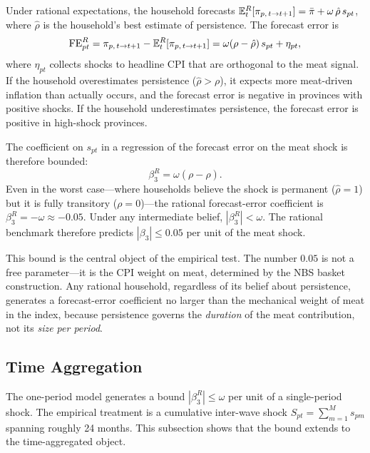Under rational expectations, the household forecasts
$\mathbb{E}_t^{R}[\pi_{p,\,t \to t+1}] = \bar{\pi}
  + \omega\,\hat{\rho}\,s_{pt}$,
where $\hat{\rho}$ is the household's best estimate of
persistence.
The forecast error is
\begin{equation}\label{eq:rational_fe}
  \mathrm{FE}^{R}_{pt}
  = \pi_{p,\,t \to t+1} - \mathbb{E}_t^{R}[\pi_{p,\,t \to t+1}]
  = \omega(\rho - \hat{\rho})\,s_{pt} + \eta_{pt},
\end{equation}
where $\eta_{pt}$ collects shocks to headline CPI that are
orthogonal to the meat signal.
If the household overestimates persistence ($\hat{\rho} > \rho$),
it expects more meat-driven inflation than actually occurs, and
the forecast error is negative in provinces with positive shocks.
If the household underestimates persistence, the forecast error
is positive in high-shock provinces.

The coefficient on $s_{pt}$ in a regression of the forecast
error on the meat shock is therefore bounded:
\begin{equation}\label{eq:rational_bound}
  \beta_3^{R} = \omega(\rho - \hat{\rho}).
\end{equation}
Even in the worst case---where households believe the shock is
permanent ($\hat{\rho} = 1$) but it is fully transitory
($\rho = 0$)---the rational forecast-error coefficient is
$\beta_3^{R} = -\omega \approx -0.05$.
Under any intermediate belief, $|\beta_3^{R}| < \omega$.
The rational benchmark therefore predicts
$|\beta_3| \leq 0.05$ per unit of the meat shock.

This bound is the central object of the empirical test.
The number $0.05$ is not a free parameter---it is the CPI
weight on meat, determined by the NBS basket construction.
Any rational household, regardless of its belief about
persistence, generates a forecast-error coefficient no larger
than the mechanical weight of meat in the index, because
persistence governs the \textit{duration} of the meat
contribution, not its \textit{size per period}.

\subsection{Time Aggregation}\label{sec:time_aggregation}

The one-period model generates a bound $|\beta_3^R| \leq \omega$
per unit of a single-period shock.
The empirical treatment is a cumulative inter-wave shock
$S_{pt} = \sum_{m=1}^{M} s_{pm}$ spanning roughly 24 months.
This subsection shows that the bound extends to the
time-aggregated object.

